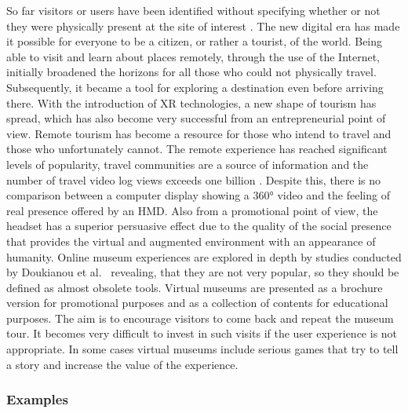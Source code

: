 So far visitors or users have been identified without specifying whether or not they were physically present at the site of interest \cite{gaberli_tourism_2019}. The new digital era has made it possible for everyone to be a citizen, or rather a tourist, of the world. Being able to visit and learn about places remotely, through the use of the Internet, initially broadened the horizons for all those who could not physically travel. Subsequently, it became a tool for exploring a destination even before arriving there. With the introduction of XR technologies, a new shape of tourism has spread, which has also become very successful from an entrepreneurial point of view. Remote tourism has become a resource for those who intend to travel and those who unfortunately cannot. The remote experience has reached significant levels of popularity, travel communities are a source of information and the number of travel video log views exceeds one billion \cite{adachi_using_2020}. Despite this, there is no comparison between a computer display showing a 360° video and the feeling of real presence offered by an HMD. Also from a promotional point of view, the headset has a superior persuasive effect due to the quality of the social presence that provides the virtual and augmented environment with an appearance of humanity.
Online museum experiences are explored in depth by studies conducted by Doukianou et al.~\cite{doukianou_beyond_2020} revealing, that they are not very popular, so they should be defined as almost obsolete tools. Virtual museums are presented as a brochure version for promotional purposes and as a collection of contents for educational purposes. The aim is to encourage visitors to come back and repeat the museum tour. It becomes very difficult to invest in such visits if the user experience is not appropriate. In some cases virtual museums include serious games that try to tell a story and increase the value of the experience. %

\subsubsection{Examples}

